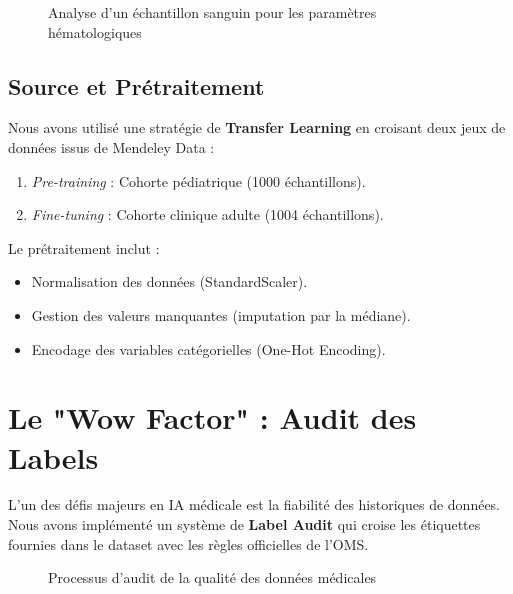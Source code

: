\documentclass[12pt,a4paper]{article}
\begin{document}
\begin{figure}[H]
\centering
{}
\caption{Analyse d'un échantillon sanguin pour les paramètres hématologiques}
\label{fig:blood_analysis}
\end{figure}

\subsection{Source et Prétraitement}
Nous avons utilisé une stratégie de \textbf{Transfer Learning} en croisant deux jeux de données issus de Mendeley Data :
\begin{enumerate}
    \item \textit{Pre-training} : Cohorte pédiatrique (1000 échantillons).
    \item \textit{Fine-tuning} : Cohorte clinique adulte (1004 échantillons).
\end{enumerate}

Le prétraitement inclut :
\begin{itemize}
    \item Normalisation des données (StandardScaler).
    \item Gestion des valeurs manquantes (imputation par la médiane).
    \item Encodage des variables catégorielles (One-Hot Encoding).
\end{itemize}

\section{Le "Wow Factor" : Audit des Labels}
\label{sec:audit}

L'un des défis majeurs en IA médicale est la fiabilité des historiques de données. Nous avons implémenté un système de \textbf{Label Audit} qui croise les étiquettes fournies dans le dataset avec les règles officielles de l'OMS.

\begin{figure}[H]
\centering
{}
\caption{Processus d'audit de la qualité des données médicales}
\label{fig:data_audit}
\end{figure}
\end{document}
